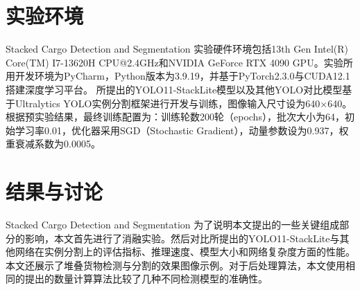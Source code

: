 \section{实验环境}{Stacked Cargo Detection and Segmentation}
实验硬件环境包括13th Gen Intel(R) Core(TM) I7-13620H CPU@2.4GHz和NVIDIA GeForce RTX 4090 GPU。实验所用开发环境为PyCharm，Python版本为3.9.19，并基于PyTorch2.3.0与CUDA12.1搭建深度学习平台。
所提出的YOLO11-StackLite模型以及其他YOLO对比模型基于Ultralytics YOLO实例分割框架进行开发与训练，图像输入尺寸设为640×640。根据预实验结果，最终训练配置为：训练轮数200轮（epochs），批次大小为64，初始学习率0.01，优化器采用SGD（Stochastic Gradient），动量参数设为0.937，权重衰减系数为0.0005。
\section{结果与讨论}{Stacked Cargo Detection and Segmentation}
为了说明本文提出的一些关键组成部分的影响，本文首先进行了消融实验。然后对比所提出的YOLO11-StackLite与其他网络在实例分割上的评估指标、推理速度、模型大小和网络复杂度方面的性能。本文还展示了堆叠货物检测与分割的效果图像示例。对于后处理算法，本文使用相同的提出的数量计算算法比较了几种不同检测模型的准确性。
